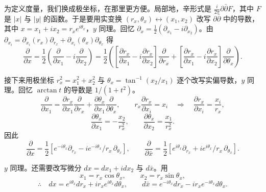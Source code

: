 为定义度量，我们换成极坐标，在那里更方便。局部地，辛形式是 $\frac{i}{2\pi}\partial\bar\partial F$，其中 $F$ 是 $|x|$ 与 $|y|$ 的函数。于是要用实变换 $(r_x,\theta_x)\leftrightarrow(x_1,x_2)$ 改写 $\partial\bar\partial$ 中的导数，其中 $x=x_1+ix_2=r_xe^{i\theta_x}$，$y$ 同理。回忆 $\partial_x=\frac12(\partial_{x_1}-i\partial_{x_2})$。由 $\partial_{x_i}=\partial_{x_i}(r_x)\partial_{r_x}+\partial_{x_i}(\theta_x)\partial_{\theta_x}$ 得
\[
\frac{\partial}{\partial x}
=\frac12\left(\frac{\partial}{\partial x_1}-i\frac{\partial}{\partial x_2}\right)
=\frac12\left(\left[\frac{\partial r_x}{\partial x_1}-i\frac{\partial r_x}{\partial x_2}\right]\frac{\partial}{\partial r_x}
+\left[\frac{\partial r_x}{\partial x_1}-i\frac{\partial r_x}{\partial x_2}\right]\frac{\partial}{\partial\theta_x}\right).
\]

接下来用极坐标 $r_x^2=x_1^2+x_2^2$ 与 $\theta_x=\tan^{-1}(x_2/x_1)$ 逐个改写实偏导数，$y$ 同理。回忆 $\arctan t$ 的导数是 $1/(1+t^2)$。
\[
\frac{\partial}{\partial x_1}=\frac{\partial r_x}{\partial x_1}\frac{\partial}{\partial r_x}+\frac{\partial\theta_x}{\partial x_1}\frac{\partial}{\partial\theta_x},
\qquad
r_x\frac{\partial r_x}{\partial x_i}=x_i\quad\Longrightarrow\quad\frac{\partial r_x}{\partial x_i}=\frac{x_i}{r_x},
\]
\[
\frac{\partial\theta_x}{\partial x_1}=-\frac{x_2}{r_x^2},\qquad
\frac{\partial\theta_x}{\partial x_2}=\frac{x_1}{r_x^2}.
\]
因此
\[
\frac{\partial}{\partial x}=\frac12\left[e^{-i\theta_x}\partial_{r_x}-ie^{-i\theta_x}/r_x\,\partial_{\theta_x}\right],
\qquad
\frac{\partial}{\partial\bar x}=\frac12\left[e^{i\theta_x}\partial_{r_x}+ie^{i\theta_x}/r_x\,\partial_{\theta_x}\right].
\]

$y$ 同理。还需要改写微分 $dx=dx_1+idx_2$ 与 $d\bar x$。用
\[
x_1=r_x\cos\theta_x,\qquad x_2=r_x\sin\theta_x,
\]
\[
\therefore\quad dx=e^{i\theta_x}dr_x+ir_xe^{i\theta_x}d\theta_x,\qquad
d\bar x=e^{-i\theta_x}dr_x-ir_xe^{-i\theta_x}d\theta_x.
\]

